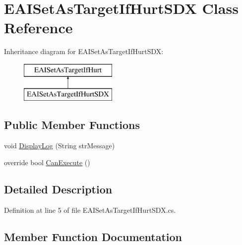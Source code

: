 \hypertarget{class_e_a_i_set_as_target_if_hurt_s_d_x}{}\section{E\+A\+I\+Set\+As\+Target\+If\+Hurt\+S\+DX Class Reference}
\label{class_e_a_i_set_as_target_if_hurt_s_d_x}
Inheritance diagram for E\+A\+I\+Set\+As\+Target\+If\+Hurt\+S\+DX\+:\begin{figure}[H]
\begin{center}
\leavevmode
\includegraphics[height=2.000000cm]{df/d42/class_e_a_i_set_as_target_if_hurt_s_d_x}
\end{center}
\end{figure}
\subsection*{Public Member Functions}
\begin{DoxyCompactItemize}
\item 
void \mbox{\hyperlink{class_e_a_i_set_as_target_if_hurt_s_d_x_a7a96f5a8642f0efafd0845e8fb5835d5}{Display\+Log}} (String str\+Message)
\item 
override bool \mbox{\hyperlink{class_e_a_i_set_as_target_if_hurt_s_d_x_a2cf8d94771fac53145b8361e2cb929e3}{Can\+Execute}} ()
\end{DoxyCompactItemize}


\subsection{Detailed Description}


Definition at line 5 of file E\+A\+I\+Set\+As\+Target\+If\+Hurt\+S\+D\+X.\+cs.



\subsection{Member Function Documentation}
\mbox{\label{class_e_a_i_set_as_target_if_hurt_s_d_x_a2cf8d94771fac53145b8361e2cb929e3}} 
